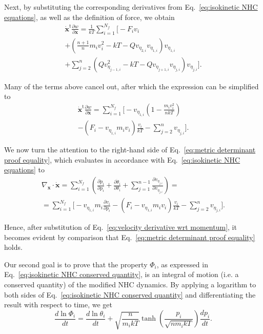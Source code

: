 \documentclass[
aip,
jcp,
reprint,
]{revtex4-1}
\newcommand{\vt}[1]{\boldsymbol{\mathbf{#1}}}          %
\newcommand{\tr}[1]{#1^\text{t}}                       %
\newcommand{\diff}[2]{\frac{\partial #2}{\partial #1}} %
\begin{document}
Next, by substituting the corresponding derivatives from Eq.~\eqref{eq:isokinetic NHC equations}, as well as the definition of force, we obtain
\begin{multline*}
\tr{\dot{\vt x}} \diff{\vt x}{w} = \frac{1}{kT} \sum_{i=1}^{N_f} \Bigg[-F_i v_i \\ 
+ \left(\frac{n+1}{n} m_i v_i^2 - kT - Q v_{\eta_{2, i}} v_{\eta_{1, i}}\right) v_{\eta_{1,i}} \\
+ \sum_{j=2}^n \left(Q v_{\eta_{j-1, i}}^2 - kT - Q v_{\eta_{j+1, i}} v_{\eta_{j, i}}\right) v_{\eta_{j,i}} \Bigg].
\end{multline*}

Many of the terms above cancel out, after which the expression can be simplified to
\begin{multline*}
\tr{\dot{\vt x}} \diff{\vt x}{w} = \sum_{i=1}^{N_f} \bigg[- v_{\eta_{1,i}}\left(1 - \frac{m_i v_i^2}{n kT}\right) \\
-\left(F_i - v_{\eta_{1,i}} m_i v_i\right) \frac{v_i}{kT} - \sum_{j=2}^n v_{\eta_{j,i}} \bigg].
\end{multline*}

We now turn the attention to the right-hand side of Eq.~\eqref{eq:metric determinant proof equality}, which evaluates in accordance with Eq.~\eqref{eq:isokinetic NHC equations} to
\begin{multline*}
\nabla_{\vt x} \cdot \dot{\vt x} = \sum_{i=1}^{N_f} \left(\diff{p_i}{\dot{p}_i} + \diff{\theta_i}{\dot{\theta}_i} + \sum_{j=1}^{n-1} \diff{v_{\eta_{j,i}}}{\dot{v}_{\eta_{j,i}}}\right) = \\
= \sum_{i=1}^{N_f} \Bigg[- v_{\eta_{1,i}} m_i \diff{p_i}{v_i} - \left(F_i - v_{\eta_{1,i}} m_i v_i\right) \frac{v_i}{kT} - \sum_{j=2}^n v_{\eta_{j,i}} \Bigg].
\end{multline*}

Hence, after substitution of Eq.~\eqref{eq:velocity derivative wrt momentum}, it becomes evident by comparison that Eq.~\eqref{eq:metric determinant proof equality} holds.

Our second goal is to prove that the property $\Phi_i$, as expressed in Eq.~\eqref{eq:isokinetic NHC conserved quantity}, is an integral of motion (i.e. a conserved quantity) of the modified NHC dynamics.
By applying a logarithm to both sides of Eq.~\eqref{eq:isokinetic NHC conserved quantity} and differentiating the result with respect to time, we get
%
\begin{equation}
\frac{d \ln \Phi_i}{dt} = \frac{d \ln \theta_i}{dt} + \sqrt{\frac{n}{m_i kT}}  \tanh\left(\frac{p_i}{\sqrt{n m_i k T}}\right) \frac{d p_i}{dt}.
\end{equation}
\end{document}
